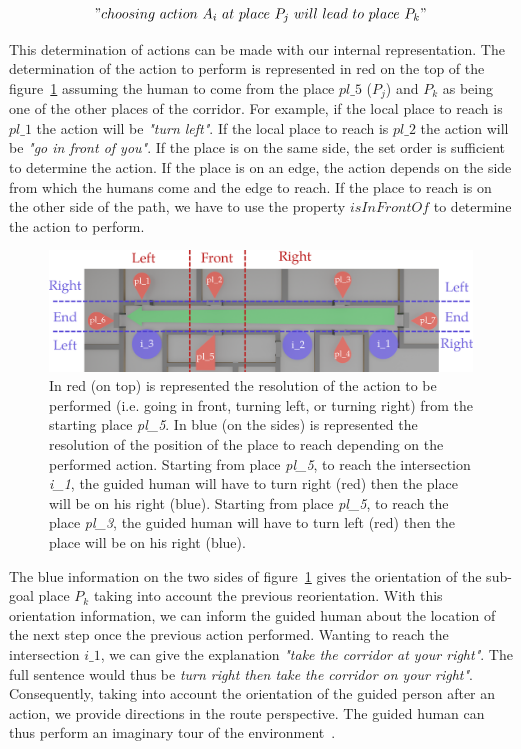 \begin{gather*}
"choosing\ action\ A_i\ at\ place\ P_j\ will\ lead\ to\ place\ P_k"
\end{gather*}

This determination of actions can be made with our internal representation. The determination of the action to perform is represented in red on the top of the figure~\ref{fig:chap3_directions} assuming the human to come from the place $pl\_5$ ($P_j$) and $P_k$ as being one of the other places of the corridor. For example, if the local place to reach is $pl\_1$ the action will be \textit{"turn left"}. If the local place to reach is $pl\_2$ the action will be \textit{"go in front of you"}. If the place is on the same side, the set order is sufficient to determine the action. If the place is on an edge, the action depends on the side from which the humans come and the edge to reach. If the place to reach is on the other side of the path, we have to use the property $isInFrontOf$ to determine the action to perform.

\begin{figure}[ht!]
\centering
\includegraphics[width=\textwidth]{figures/chapter3/directions.png}
\caption{\label{fig:chap3_directions} In red (on top) is represented the resolution of the action to be performed (i.e. going in front, turning left, or turning right) from the starting place \textit{pl\_5}. In blue (on the sides) is represented the resolution of the position of the place to reach depending on the performed action. Starting from place \textit{pl\_5}, to reach the intersection \textit{i\_1}, the guided human will have to turn right (red) then the place will be on his right (blue). Starting from place \textit{pl\_5}, to reach the place \textit{pl\_3}, the guided human will have to turn left (red) then the place will be on his right (blue). }
\end{figure}

The blue information on the two sides of figure~\ref{fig:chap3_directions} gives the orientation of the sub-goal place $P_{k}$ taking into account the previous reorientation. With this orientation information, we can inform the guided human about the location of the next step once the previous action performed. Wanting to reach the intersection $i\_1$, we can give the explanation \textit{"take the corridor at your right"}. The full sentence would thus be \textit{turn right then take the corridor on your right"}. Consequently, taking into account the orientation of the guided person after an action, we provide directions in the route perspective. The guided human can thus perform an imaginary tour of the environment~\cite{cassell_2007_trading}.

